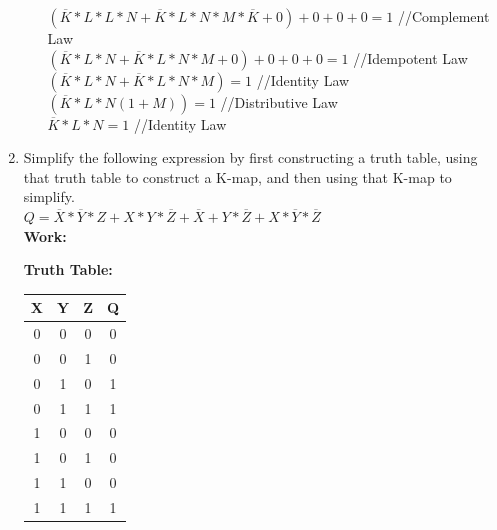 \documentclass[11pt]{article}
\begin{document}
\begin{enumerate}
\begin{enumerate}[(a)]
            $(\overline{K}* L * L * N + \overline{K} * L * N * M * \overline{K} + 0) + 0 + 0 + 0= 1$ //Complement Law\\
            $(\overline{K} * L * N + \overline{K} * L * N * M + 0) + 0 + 0 + 0 = 1$ //Idempotent Law\\
            $(\overline{K} * L * N + \overline{K} * L * N * M) = 1$ //Identity Law\\
            $(\overline{K} * L * N(1 + M)) = 1$ //Distributive Law\\
            $\overline{K} * L * N = 1$ //Identity Law
            \begin{center}
            \end{center}
    \end{enumerate}

    \item Simplify the following expression by first constructing a truth table, using that truth table to
    construct a K-map, and then using that K-map to simplify.\\
    $Q = \overline{X} * \overline{Y} * Z + X * Y * \overline{Z} + \overline{X} + Y * \overline{Z} + X * \overline{Y} * \overline{Z}$\\
    \textbf{Work:}
    \begin{center}
        \textbf{Truth Table:}\\
        \begin{tabular}{c c c | c}\\
            X & Y & Z & Q \\
        \hline
            0 & 0 & 0 & 0 \\
            0 & 0 & 1 & 0 \\
            0 & 1 & 0 & 1 \\
            0 & 1 & 1 & 1 \\
            1 & 0 & 0 & 0 \\
            1 & 0 & 1 & 0 \\
            1 & 1 & 0 & 0 \\
            1 & 1 & 1 & 1 \\
        \end{tabular}\\ [0.25in]


\end{center}
\end{enumerate}
\end{document}
